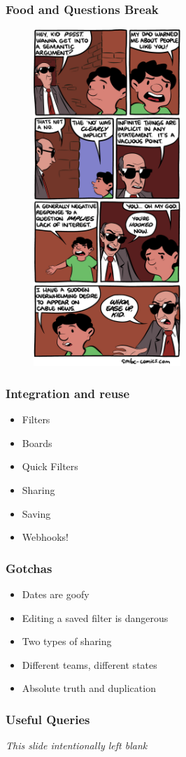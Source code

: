 \documentclass{beamer}
\begin{document}
\begin{frame}[fragile]
  \frametitle{Food and Questions Break}
   \begin{figure}[p]
    \centering
    \includegraphics[width=15em]{comic.png}
  \end{figure}
\end{frame}
\begin{frame}[fragile]
  \frametitle{Integration and reuse}

  \begin{itemize}
  \item{Filters}
  \item{Boards}
  \item{Quick Filters}
  \item{Sharing}
  \item{Saving}
  \item{Webhooks!}
  \end{itemize}
  
\end{frame}

\begin{frame}[fragile]
  \frametitle{Gotchas}
  \begin{itemize}
  \item{Dates are goofy}
  \item{Editing a saved filter is dangerous}
  \item{Two types of sharing}
  \item{Different teams, different states}
  \item{Absolute truth and duplication}
  \end{itemize}
\end{frame}

\begin{frame}[fragile]
  \frametitle{Useful Queries}
  \centering\huge{\em This slide intentionally left blank}
\end{frame}
\end{document}
